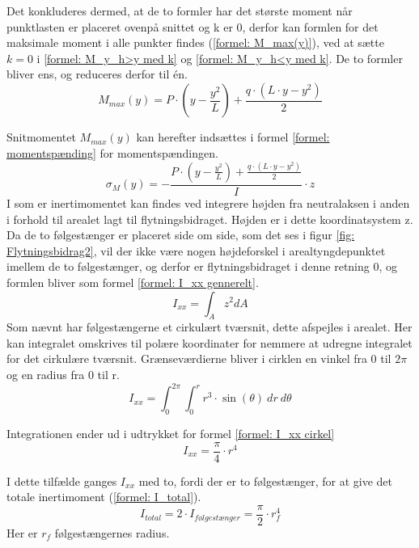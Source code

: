 Det konkluderes dermed, at de to formler har det største moment når punktlasten er placeret ovenpå snittet og k er 0, derfor kan formlen for det maksimale moment i alle punkter findes (\ref{formel: M_max(y)}), ved at sætte $k=0$ i \ref{formel: M_y_h>y med k} og \ref{formel: M_y_h<y med k}. De to formler bliver ens, og reduceres derfor til én.
\begin{equation} \label{formel: M_max(y)}
   M_{max}(y)= P\cdot (y-\frac{y^2}{L})+\frac {q\cdot( L \cdot y-y^2)}{2}
\end{equation}

Snitmomentet ${M_{max}(y)}$ kan herefter indsættes i formel \ref{formel: momentspænding} for momentspændingen.
\begin{equation} \label{formel: Momentspændninger med M_max}
    \sigma_M(y) =-\frac{P\cdot (y-\frac{y^2}{L})+\frac {q\cdot( L \cdot y-y^2)}{2}}{I}\cdot z
\end{equation}
I som er inertimomentet kan findes ved integrere højden fra neutralaksen i anden i forhold til arealet lagt til flytningsbidraget. Højden er i dette koordinatsystem z. Da de to følgestænger er placeret side om side, som det ses i figur \ref{fig: Flytningsbidrag2}, vil der ikke være nogen højdeforskel i arealtyngdepunktet imellem de to følgestænger, og derfor er flytningsbidraget i denne retning 0, og formlen bliver som formel \ref{formel: I_xx gennerelt}.
\begin{equation} \label{formel: I_xx gennerelt}
    I_{xx} = \int_{A} z^2 dA
\end{equation}
Som nævnt har følgestængerne et cirkulært tværsnit, dette afspejles i arealet. Her kan integralet omskrives til polære koordinater for nemmere at udregne integralet for det cirkulære tværsnit. Grænseværdierne bliver i cirklen en vinkel fra 0 til $2\pi$ og en radius fra 0 til r.
\begin{equation} \label{formel: I_xx cirkel udledning}
    I_{xx} =\int_0^{2\pi} \int_0^r r^3\cdot \sin(\theta) \ dr \ d\theta    
\end{equation}

Integrationen ender ud i udtrykket for formel \ref{formel: I_xx cirkel}
\begin{equation}\label{formel: I_xx cirkel}
    I_{xx} =\frac{\pi}{4}\cdot r^4  
\end{equation}

I dette tilfælde ganges $I_{xx}$ med to, fordi der er to følgestænger, for at give det totale inertimoment (\ref{formel: I_total}).
\begin{equation}\label{formel: I_total}
    I_{total} =2 \cdot I_{\textit{følgestænger}} = \frac{\pi}{2}\cdot r_f^4 
\end{equation}
Her er $r_f$ følgestængernes radius.

